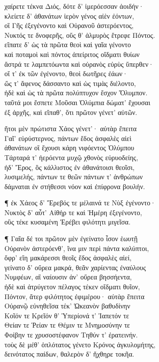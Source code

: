 \quad{}χαίρετε τέκνα Διός, δότε δ' ἱμερόεσσαν ἀοιδήν· \\
κλείετε δ' ἀθανάτων ἱερὸν γένος αἰὲν ἐόντων, \\
οἳ Γῆς ἐξεγένοντο καὶ Οὐρανοῦ ἀστερόεντος,\\
Νυκτός τε δνοφερῆς, οὕς θ' ἁλμυρὸς ἔτρεφε Πόντος.\\
εἴπατε δ' ὡς τὰ πρῶτα θεοὶ καὶ γαῖα γένοντο \\
καὶ ποταμοὶ καὶ πόντος ἀπείριτος οἴδματι θυίων \\
ἄστρά τε λαμπετόωντα καὶ οὐρανὸς εὐρὺς ὕπερθεν·  \\
οἵ τ' ἐκ τῶν ἐγένοντο, θεοὶ δωτῆρες ἐάων· \\
ὥς τ' ἄφενος δάσσαντο καὶ ὡς τιμὰς διέλοντο, \\
ἠδὲ καὶ ὡς τὰ πρῶτα πολύπτυχον ἔσχον Ὄλυμπον.\\
ταῦτά μοι ἔσπετε Μοῦσαι Ὀλύμπια δώματ' ἔχουσαι \\
ἐξ ἀρχῆς, καὶ εἴπαθ', ὅτι πρῶτον γένετ' αὐτῶν. 

\quad{}ἤτοι μὲν πρώτιστα Χάος γένετ'· αὐτὰρ ἔπειτα\\
Γαῖ' εὐρύστερνος, πάντων ἕδος ἀσφαλὲς αἰεὶ\\
ἀθανάτων οἳ ἔχουσι κάρη νιφόεντος Ὀλύμπου \\
Τάρταρά τ' ἠερόεντα μυχῷ χθονὸς εὐρυοδείης,\\
ἠδ' Ἔρος, ὃς κάλλιστος ἐν ἀθανάτοισι θεοῖσι, \\
λυσιμελής, πάντων τε θεῶν πάντων τ' ἀνθρώπων\\
δάμναται ἐν στήθεσσι νόον καὶ ἐπίφρονα βουλήν.

¶ ἐκ Χάεος δ' Ἔρεβός τε μέλαινά τε Νὺξ ἐγένοντο· \\
Νυκτὸς δ' αὖτ' Αἰθήρ τε καὶ Ἡμέρη ἐξεγένοντο,\\
οὓς τέκε κυσαμένη Ἐρέβει φιλότητι μιγεῖσα. 

¶ Γαῖα δέ τοι πρῶτον μὲν ἐγείνατο ἶσον ἑωυτῇ\\
Οὐρανὸν ἀστερόενθ', ἵνα μιν περὶ πάντα καλύπτοι,\\
ὄφρ' εἴη μακάρεσσι θεοῖς ἕδος ἀσφαλὲς αἰεί,\\
γείνατο δ' οὔρεα μακρά, θεᾶν χαρίεντας ἐναύλους \\
Νυμφέων, αἳ ναίουσιν ἀν' οὔρεα βησσήεντα,  \\
ἠδὲ καὶ ἀτρύγετον πέλαγος τέκεν οἴδματι θυῖον,\\
Πόντον, ἄτερ φιλότητος ἐφιμέρου· αὐτὰρ ἔπειτα\\
Οὐρανῷ εὐνηθεῖσα τέκ' Ὠκεανὸν βαθυδίνην \\
Κοῖόν τε Κρεῖόν θ' Ὑπερίονά τ' Ἰαπετόν τε\\
Θείαν τε Ῥείαν τε Θέμιν τε Μνημοσύνην τε \\
Φοίβην τε χρυσοστέφανον Τηθύν τ' ἐρατεινήν.\\
τοὺς δὲ μέθ' ὁπλότατος γένετο Κρόνος ἀγκυλομήτης,\\
δεινότατος παίδων, θαλερὸν δ' ἤχθηρε τοκῆα. 


